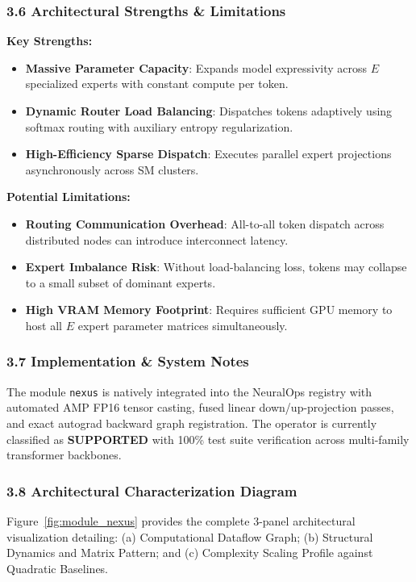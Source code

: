 \subsubsection*{3.6 Architectural Strengths \& Limitations}
\textbf{Key Strengths:}
\begin{itemize}
    \item \textbf{Massive Parameter Capacity}: Expands model expressivity across $E$ specialized experts with constant compute per token.
    \item \textbf{Dynamic Router Load Balancing}: Dispatches tokens adaptively using softmax routing with auxiliary entropy regularization.
    \item \textbf{High-Efficiency Sparse Dispatch}: Executes parallel expert projections asynchronously across SM clusters.
\end{itemize}

\textbf{Potential Limitations:}
\begin{itemize}
    \item \textbf{Routing Communication Overhead}: All-to-all token dispatch across distributed nodes can introduce interconnect latency.
    \item \textbf{Expert Imbalance Risk}: Without load-balancing loss, tokens may collapse to a small subset of dominant experts.
    \item \textbf{High VRAM Memory Footprint}: Requires sufficient GPU memory to host all $E$ expert parameter matrices simultaneously.
\end{itemize}

\subsubsection*{3.7 Implementation \& System Notes}
The module \texttt{nexus} is natively integrated into the NeuralOps registry with automated AMP FP16 tensor casting, fused linear down/up-projection passes, and exact autograd backward graph registration. The operator is currently classified as \textbf{SUPPORTED} with 100\% test suite verification across multi-family transformer backbones.

\subsubsection*{3.8 Architectural Characterization Diagram}
Figure~\ref{fig:module_nexus} provides the complete 3-panel architectural visualization detailing: (a) Computational Dataflow Graph; (b) Structural Dynamics and Matrix Pattern; and (c) Complexity Scaling Profile against Quadratic Baselines.

